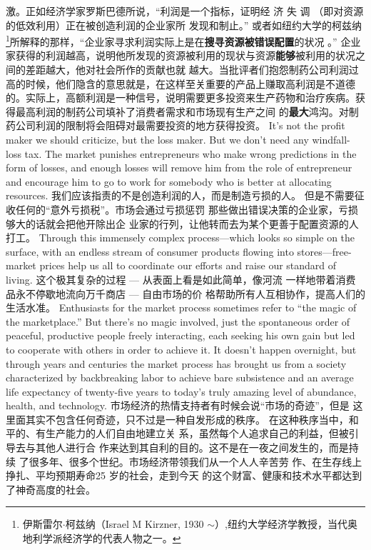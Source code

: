 \begin{paracol}{2}
激。正如经济学家罗斯巴德所说，“利润是一个指标，证明经
济 失 调 （即对资源的低效利用）正在被创造利润的企业家所
发现和制止。” 或者如纽约大学的柯兹纳\footnote{伊斯雷尔$\cdot$柯兹纳（Israel  M Kirzner, 1930 $\sim$）,纽约大学经济学教授，当代奥地利学派经济学的代表人物之一。}所解释的那样，“企业家寻求利润实际上是在\textbf{搜寻资源被错误配置}的状况 。” 企业家获得的利润越高，说明他所发现的资源被利用的现状与资源\textbf{能够}被利用的状况之间的差距越大，他对社会所作的贡献也就
越大。当批评者们抱怨制药公司利润过高的时候，他们隐含的意思就是，在这样至关重要的产品上赚取高利润是不道德的。实际上，高额利润是一种信号，说明需要更多投资来生产药物和治疗疾病。获得最高利润的制药公司填补了消费者需求和市场现有生产之间 的\textbf{最大}鸿沟。对制药公司利润的限制将会阻碍对最需要投资的地方获得投资。
\switchcolumn*
It's not the profit maker we should criticize, but the loss
maker. But we don't need any windfall-loss tax. The market
punishes entrepreneurs who make wrong predictions in the
form of losses, and enough losses will remove him from the role
of entrepreneur and encourage him to go to work for somebody
who is better at allocating resources.
\switchcolumn
我们应该指责的不是创造利润的人，而是制造亏损的人。
但是不需要征收任何的“意外亏损税”。市场会通过亏损惩罚
那些做出错误决策的企业家，亏损够大的话就会把他开除出企
业家的行列，让他转而去为某个更善于配置资源的人打工。
\switchcolumn*
Through this immensely complex process---which looks so
simple on the surface, with an endless stream of consumer products flowing into stores---free-market prices help us all to coordinate our efforts and raise our standard of living.
\switchcolumn
这个极其复杂的过程 --- 从表面上看是如此简单，像河流
一样地带着消费品永不停歇地流向万千商店 --- 自由市场的价
格帮助所有人互相协作，提高人们的生活水准。
\switchcolumn*
Enthusiasts for the market process sometimes refer to ``the magic of the marketplace.'' But there's no magic involved, just
the spontaneous order of peaceful, productive people freely interacting, each seeking his own gain but led to cooperate with
others in order to achieve it. It doesn't happen overnight, but
through years and centuries the market process has brought us
from a society characterized by backbreaking labor to achieve
bare subsistence and an average life expectancy of twenty-five
years to today's truly amazing level of abundance, health, and
technology.
\switchcolumn
市场经济的热情支持者有时候会说“市场的奇迹”，但是
这里面其实不包含任何奇迹，只不过是一种自发形成的秩序。
在这种秩序当中，和平的、有生产能力的人们自由地建立关
系，虽然每个人追求自己的利益，但被引导去与其他人进行合
作来达到其自利的目的。这不是在一夜之间发生的，而是持续
了很多年、很多个世纪。市场经济带领我们从一个人人辛苦劳
作、在生存线上挣扎、平均预期寿命25 岁的社会，走到今天
的这个财富、健康和技术水平都达到了神奇高度的社会。


\end{paracol}
